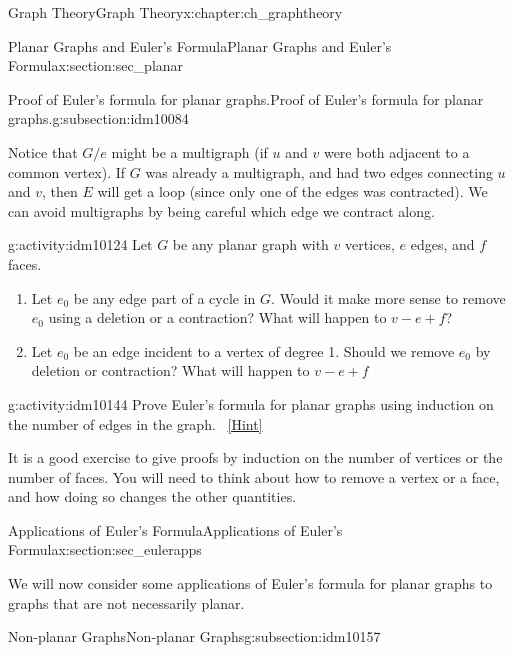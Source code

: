 \documentclass[oneside,10pt,]{book}
\numberwithin{equation}{chapter}
\begin{document}
\begin{chapterptx}{Graph Theory}{}{Graph Theory}{}{}{x:chapter:ch_graphtheory}
\begin{sectionptx}{Planar Graphs and Euler's Formula}{}{Planar Graphs and Euler's Formula}{}{}{x:section:sec_planar}
\begin{subsectionptx}{Proof of Euler's formula for planar graphs.}{}{Proof of Euler's formula for planar graphs.}{}{}{g:subsection:idm10084}
\begin{enumerate}
\end{enumerate}
Notice that \(G/e\) might be a multigraph (if \(u\) and \(v\) were both adjacent to a common vertex).  If \(G\) was already a multigraph, and had two edges connecting \(u\) and \(v\), then \(E\) will get a loop (since only one of the edges was contracted).  We can avoid multigraphs by being careful which edge we contract along.%
\begin{activity}{}{g:activity:idm10124}%
Let \(G\) be any planar graph with \(v\) vertices, \(e\) edges, and \(f\) faces.%
\begin{enumerate}[font=\bfseries,label=(\alph*),ref=\alph*]
\item{}Let \(e_0\) be any edge part of a cycle in \(G\).  Would it make more sense to remove \(e_0\) using a deletion or a contraction?  What will happen to \(v - e + f\)?%
\item{}Let \(e_0\) be an edge incident to a vertex of degree 1.  Should we remove \(e_0\) by deletion or contraction?  What will happen to \(v- e + f\)%
\end{enumerate}
\end{activity}
\begin{activity}{}{g:activity:idm10144}%
Prove Euler's formula for planar graphs using induction on the number of edges in the graph.%
\qquad~\hfill{\tiny\hyperlink{g:hint:idm10147-back}{[Hint]}}\end{activity}
It is a good exercise to give proofs by induction on the number of vertices or the number of faces.  You will need to think about how to remove a vertex or a face, and how doing so changes the other quantities.%
\end{subsectionptx}
\end{sectionptx}
%
%
\typeout{************************************************}
\typeout{************************************************}
%
\begin{sectionptx}{Applications of Euler's Formula}{}{Applications of Euler's Formula}{}{}{x:section:sec_eulerapps}
\begin{introduction}{}%
We will now consider some applications of Euler's formula for planar graphs to graphs that are not necessarily planar.%
\end{introduction}%
%
%
\typeout{************************************************}
\typeout{************************************************}
%
\begin{subsectionptx}{Non-planar Graphs}{}{Non-planar Graphs}{}{}{g:subsection:idm10157}

\end{subsectionptx}
\end{sectionptx}
\end{chapterptx}
\end{document}
